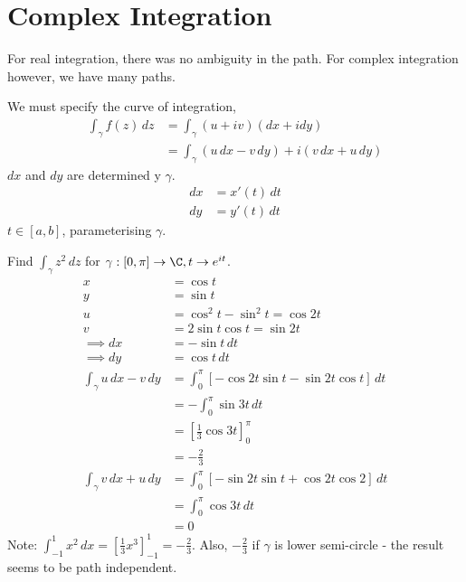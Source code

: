 \documentclass[a4paper, 11pt, normalem]{report}
\begin{document}
\section{Complex Integration}
For real integration, there was no ambiguity in the path. For complex integration however, we have many paths.

We must specify the curve of integration,
\begin{align}
    \int_\gamma f(z)\,dz &= \int_\gamma (u+iv)(dx + idy) \\
                         &= \int_\gamma (u\,dx - v\,dy) + i(v\,dx + u\,dy)
\end{align}
$dx$ and $dy$ are determined y $\gamma$.
\begin{align}
    dx &= x'(t)\,dt \\
    dy &= y'(t)\,dt
\end{align}
$t \in [a,b]$, parameterising $\gamma$.

\begin{example}
    Find $\int_\gamma z^2\,dz$ for $\gamma: [0,\pi] \to \C, t \to e^{it}$.
    \begin{align}
        x &= \cos t \\
        y &= \sin t \\
        u &= \cos^2t - \sin^2t = \cos 2t \\
        v &= 2\sin t\cos t = \sin 2t \\
        \implies dx &= -\sin t\, dt \\
        \implies dy &= \cos t\,dt \\
        \int_\gamma u\,dx - v\,dy &= \int_{0}^{\pi} [-\cos 2t \sin t - \sin 2t\cos t]\,dt \\
                                  &= -\int_{0}^{\pi} \sin 3t\,dt \\
                                  &= \left[\frac{1}{3}\cos 3t\right]_{0}^{\pi} \\
                                  &= -\frac{2}{3} \\
        \int_\gamma v\,dx + u\,dy &= \int_{0}^{\pi} [-\sin 2t\sin t + \cos 2t\cos 2]\,dt \\
                                  &= \int_{0}^{\pi} \cos 3t\,dt \\
                                  &= 0
    \end{align}
    Note: $\int_{-1}^{1} x^2\,dx = [\frac{1}{3}x^3]_{-1}^{1} = -\frac{2}{3}$.
    Also, $-\frac{2}{3}$ if $\gamma$ is lower semi-circle - the result seems to be path independent.
\end{example}
\end{document}
